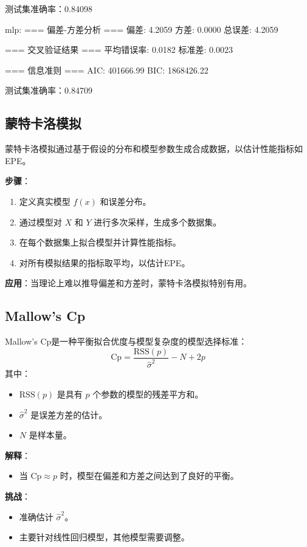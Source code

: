 \documentclass[11pt,a4paper]{article}
\begin{document}
测试集准确率：0.84098

mlp:
=== 偏差-方差分析 ===
偏差: 4.2059
方差: 0.0000
总误差: 4.2059

=== 交叉验证结果 ===
平均错误率: 0.0182
标准差: 0.0023

=== 信息准则 ===
AIC: 401666.99
BIC: 1868426.22

测试集准确率：0.84709

\subsection{蒙特卡洛模拟}

蒙特卡洛模拟通过基于假设的分布和模型参数生成合成数据，以估计性能指标如EPE。

\textbf{步骤}：
\begin{enumerate}
    \item 定义真实模型 $f(x)$ 和误差分布。
    \item 通过模型对 $X$ 和 $Y$ 进行多次采样，生成多个数据集。
    \item 在每个数据集上拟合模型并计算性能指标。
    \item 对所有模拟结果的指标取平均，以估计EPE。
\end{enumerate}

\textbf{应用}：当理论上难以推导偏差和方差时，蒙特卡洛模拟特别有用。

\subsection{Mallow’s Cp}

Mallow’s Cp是一种平衡拟合优度与模型复杂度的模型选择标准：
\begin{equation}
\text{Cp} = \frac{\text{RSS}(p)}{\hat{\sigma}^2} - N + 2p
\end{equation}
其中：
\begin{itemize}
    \item $\text{RSS}(p)$ 是具有 $p$ 个参数的模型的残差平方和。
    \item $\hat{\sigma}^2$ 是误差方差的估计。
    \item $N$ 是样本量。
\end{itemize}

\textbf{解释}：
\begin{itemize}
    \item 当 $\text{Cp} \approx p$ 时，模型在偏差和方差之间达到了良好的平衡。
\end{itemize}

\textbf{挑战}：
\begin{itemize}
    \item 准确估计 $\hat{\sigma}^2$。
    \item 主要针对线性回归模型，其他模型需要调整。
\end{itemize}
\end{document}
